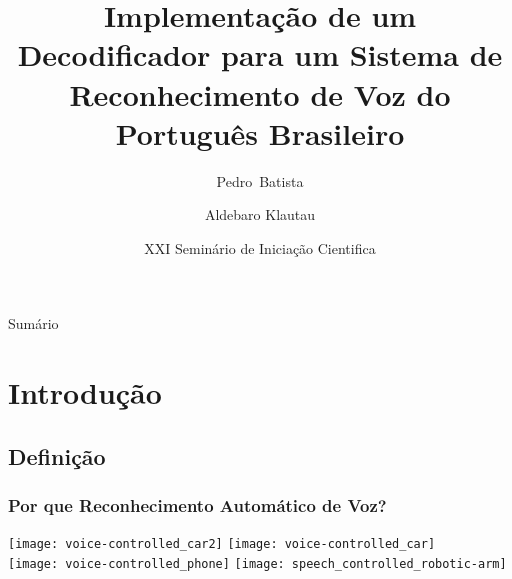 \documentclass{beamer}
\title[Reconhecimento de Voz para Português Brasileiro] %
{Implementação de um Decodificador para um Sistema de Reconhecimento de Voz do Português Brasileiro}
\author%
{Pedro~Batista \and Aldebaro Klautau}%
\institute %
{
	    Grupo FalaBrasil\\
   Laboratório de Processamento de Sinais \\
      Universidade Federal do Pará \\
      http://www.laps.ufpa.br/falabrasil\\%
\texttt{[image: logo\_cnpq]}
}
\date[21 de Outubro de 2010] %
{XXI Seminário de Iniciação Cientifica}
\begin{document}
\begin{frame}
\titlepage
\end{frame}

\begin{frame}{Sumário}

\footnotesize
\tableofcontents
\end{frame}



   \section{Introdução}
   \subsection{Definição}

\begin{frame}
   \frametitle{Por que Reconhecimento Automático de Voz?}
   \vspace{0.5cm}
   \texttt{[image: voice-controlled\_car2]}
   \hspace{1cm}
   \texttt{[image: voice-controlled\_car]}\\

   \texttt{[image: voice-controlled\_phone]}
   \texttt{[image: speech\_controlled\_robotic-arm]}
\end{frame}
\end{document}
